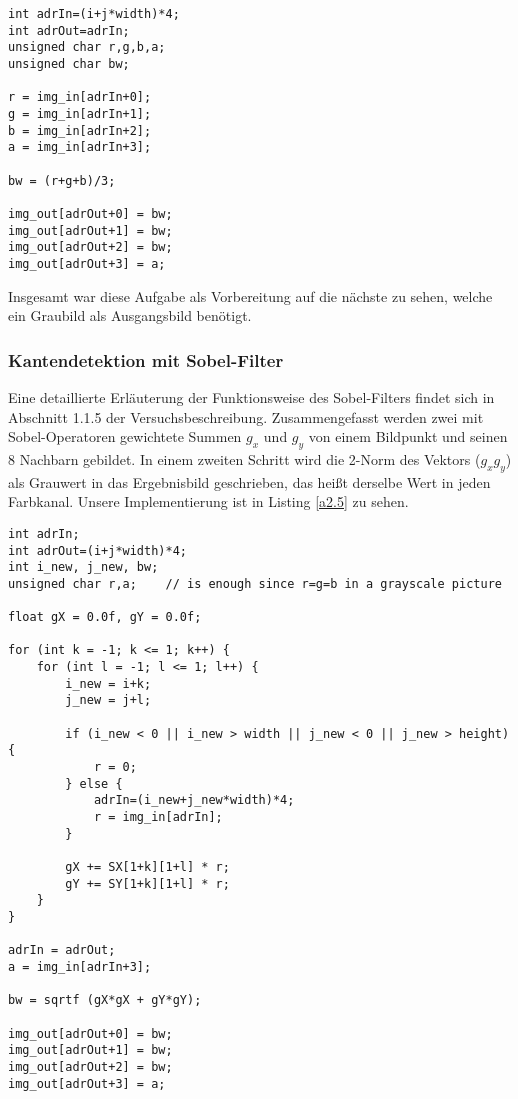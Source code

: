 \documentclass[12pt,a4paper]{scrartcl}
\begin{document}
\begin{lstlisting}[caption=bwKernel,label=a2.4]
int adrIn=(i+j*width)*4;
int adrOut=adrIn;
unsigned char r,g,b,a;
unsigned char bw;

r = img_in[adrIn+0];
g = img_in[adrIn+1];
b = img_in[adrIn+2];
a = img_in[adrIn+3];

bw = (r+g+b)/3;

img_out[adrOut+0] = bw;
img_out[adrOut+1] = bw;
img_out[adrOut+2] = bw;
img_out[adrOut+3] = a;
\end{lstlisting}

Insgesamt war diese Aufgabe als Vorbereitung auf die n\"achste zu sehen, welche ein Graubild als Ausgangsbild ben\"otigt.

\subsubsection{Kantendetektion mit Sobel-Filter}
Eine detaillierte Erl\"auterung der Funktionsweise des Sobel-Filters findet sich in Abschnitt 1.1.5 der Versuchsbeschreibung.
Zusammengefasst werden zwei mit Sobel-Operatoren gewichtete Summen $g_x$ und $g_y$ von einem Bildpunkt und seinen 8 Nachbarn gebildet.
In einem zweiten Schritt wird die 2-Norm des Vektors ($g_x g_y$) als Grauwert in das Ergebnisbild geschrieben, das hei\ss t derselbe Wert in jeden Farbkanal.
Unsere Implementierung ist in Listing \ref{a2.5} zu sehen.

\begin{lstlisting}[caption=sobelKernel,label=a2.5,breaklines=true]
int adrIn;
int adrOut=(i+j*width)*4;
int i_new, j_new, bw;
unsigned char r,a;    // is enough since r=g=b in a grayscale picture

float gX = 0.0f, gY = 0.0f;

for (int k = -1; k <= 1; k++) {
    for (int l = -1; l <= 1; l++) {
        i_new = i+k;
        j_new = j+l;

        if (i_new < 0 || i_new > width || j_new < 0 || j_new > height) {
            r = 0;
        } else {
            adrIn=(i_new+j_new*width)*4;
            r = img_in[adrIn];
        }

        gX += SX[1+k][1+l] * r;
        gY += SY[1+k][1+l] * r;
    }
}

adrIn = adrOut;
a = img_in[adrIn+3];

bw = sqrtf (gX*gX + gY*gY);

img_out[adrOut+0] = bw;
img_out[adrOut+1] = bw;
img_out[adrOut+2] = bw;
img_out[adrOut+3] = a;
\end{lstlisting}
\end{document}
